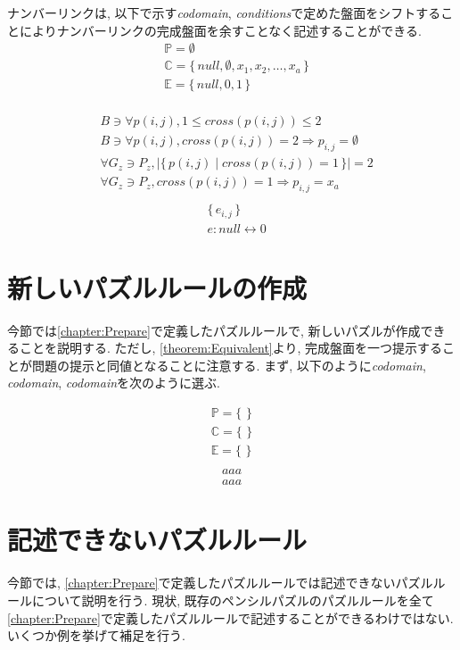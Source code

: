 \begin{example}[ナンバーリンクの数学的記述]
  ナンバーリンクは, 以下で示す\textit{codomain}, \textit{conditions}で定めた盤面をシフトすることによりナンバーリンクの完成盤面を余すことなく記述することができる.
  \begin{align}
     & \mathbb{P}=\emptyset                                             \\
     & \mathbb{C}=\{\,\textit{null}, \emptyset ,x_1,x_2,\ldots, x_a\,\} \\
     & \mathbb{E}=\{\,\textit{null},0,1\,\}                             \\
  \end{align}

  \begin{align}
     & B\ni \forall p(i,j),1\le \textit{cross}(p(i,j))\le 2                          \\
     & B\ni \forall p(i,j),  \textit{cross}(p(i,j))= 2 \Rightarrow p_{i,j}=\emptyset \\
     & \forall G_z\ni P_z,        |\{\,p(i,j)\mid cross(p(i,j))=1\,\}|=2             \\
     & \forall G_z\ni P_z,     \textit{cross}(p(i,j))= 1 \Rightarrow p_{i,j}=x_a     \\
  \end{align}
  \begin{align}
     & \{\,e_{i,j}\,\}                  \\
     & e:\textit{null}\leftrightarrow 0
  \end{align}

\end{example}

\section{新しいパズルルールの作成}\label{section:NewPuzzleRule}
今節では\cref{chapter:Prepare}で定義したパズルルールで, 新しいパズルが作成できることを説明する. ただし, \cref{theorem:Equivalent}より, 完成盤面を一つ提示することが問題の提示と同値となることに注意する. まず, 以下のように\textit{codomain}, \textit{codomain}, \textit{codomain}を次のように選ぶ.

\begin{align}
  \mathbb{P}=\{\,\,\} \\
  \mathbb{C}=\{\,\,\} \\
  \mathbb{E}=\{\,\,\} \\
\end{align}
\begin{align}
  aaa
\end{align}
\begin{align}
  aaa
\end{align}


\section{記述できないパズルルール}\label{section:CannotDescribePuzzleRule}
今節では, \cref{chapter:Prepare}で定義したパズルルールでは記述できないパズルルールについて説明を行う.
現状, 既存のペンシルパズルのパズルルールを全て\cref{chapter:Prepare}で定義したパズルルールで記述することができるわけではない. いくつか例を挙げて補足を行う.
